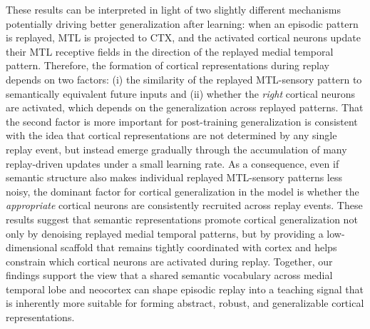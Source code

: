 \documentclass{article}
\begin{document}
\newline\newline
These results can be interpreted in light of two slightly different mechanisms potentially driving better generalization after learning: when an episodic pattern is replayed, MTL is projected to CTX, and the activated cortical neurons update their MTL receptive fields in the direction of the replayed medial temporal pattern. Therefore, the formation of cortical representations during replay depends on two factors: (i) the similarity of the replayed MTL-sensory pattern to semantically equivalent future inputs and (ii) whether the \textit{right} cortical neurons are activated, which depends on the generalization across replayed patterns. That the second factor is more important for post-training generalization is consistent with the idea that cortical representations are not determined by any single replay event, but instead emerge gradually through the accumulation of many replay-driven updates under a small learning rate. As a consequence, even if semantic structure also makes individual replayed MTL-sensory patterns less noisy, the dominant factor for cortical generalization in the model is whether the \textit{appropriate} cortical neurons are consistently recruited across replay events.
\newline\newline
These results suggest that semantic representations promote cortical generalization not only by denoising replayed medial temporal patterns, but by providing a low-dimensional scaffold that remains tightly coordinated with cortex and helps constrain which cortical neurons are activated during replay. Together, our findings support the view that a shared semantic vocabulary across medial temporal lobe and neocortex can shape episodic replay into a teaching signal that is inherently more suitable for forming abstract, robust, and generalizable cortical representations.
\end{document}
